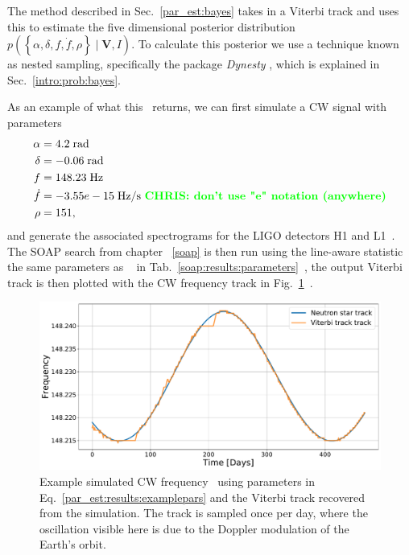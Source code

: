 The method described in Sec.~\ref{par_est:bayes} takes in a Viterbi track and
uses this to estimate the five dimensional posterior distribution
$p\left(\left\{ \alpha, \delta, f, \dot{f}, \rho \right\} \mid \bm{V}, I
\right)$.  To calculate this posterior we use a technique known as nested
sampling, specifically the package {\it Dynesty}
\citep{speagle2019DynestyDynamic}, which is explained in
Sec.~\ref{intro:prob:bayes}. 

As an example of what this~ returns, we can first simulate a \gls{CW} signal with
parameters 
%
\begin{equation}
    \label{par_est:results:examplepars}
    \begin{split}
        \alpha &= 4.2 \; \rm{rad}\\
        \delta &= -0.06 \; \rm{rad} \\
        f &= 148.23 \; \rm{Hz}\\
        \dot{f} &= -3.55e-15 \; \rm{Hz/s}~\textbf{\textcolor{green}{CHRIS: don't use "e" notation (anywhere)}}\\
        \rho &= 151,\\
    \end{split}
\end{equation}
%
and generate the associated spectrograms for the \gls{LIGO} detectors H1 and
L1~. The SOAP search from
chapter~
\ref{soap} is then run using the line-aware statistic~ the same
parameters as ~ in Tab.~\ref{soap:results:parameters}~, the output Viterbi track is then plotted with the \gls{CW}
frequency track in Fig.~\ref{par_est:results:freqtrack}~. 
%
\begin{figure}[ht]
    \centering
    \includegraphics[width=\linewidth]{C5_parameter/example_freqtrack.pdf}
    \caption[Frequency track of injected signal]{ Example simulated \gls{CW}
frequency~ using parameters in Eq.~\ref{par_est:results:examplepars} and the
Viterbi track recovered from the simulation. The track is sampled once per day,
where the oscillation visible here is due to the Doppler modulation of the
Earth's orbit.~} \label{par_est:results:freqtrack}    
\end{figure}
